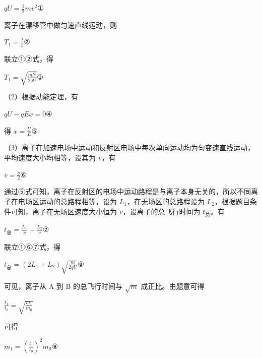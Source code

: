 \documentclass[\gkver]{gaokaozhenti}
\begin{document}
\begin{enumerate}
{$qU=\frac{1}{2}mv^{2}$①

离子在漂移管中做匀速直线运动，则

$T_{1}=\frac{l}{v}$②

联立①②式，得

$T_{1}=\sqrt{\frac{ml^{2}}{2qU}}$③

（2）根据动能定理，有

$qU-qEx=0$④

得 $x=\frac{U}{E}$⑤

（3）离子在加速电场中运动和反射区电场中每次单向运动均为匀变速直线运动，平均速度大小均相等，设其为 $\overline{v}$，有

$\overline{v}=\frac{v}{2}$⑥

通过⑤式可知，离子在反射区的电场中运动路程是与离子本身无关的，所以不同离子在电场区运动的总路程相等，设为 $L_{1}$，在无场区的总路程设为 $L_{2}$，根据题目条件可知，离子在无场区速度大小恒为 $v$，设离子的总飞行时间为 $t_{\text{总}}$。有

$t_{\text{总}}=\frac{L_{1}}{\overline{v}}+\frac{L_{2}}{v}$⑦

联立①⑥⑦式，得

$t_{\text{总}}=(2L_{1}+L_{2})\sqrt{\frac{m}{2qU}}$⑧

可见，离子从 A 到 B 的总飞行时间与 $\sqrt{m}$ 成正比。由题意可得

$\frac{t_{1}}{t_{0}}=\sqrt{\frac{m_{1}}{m_{0}}}$

可得

$m_{1}=\left(\frac{t_{1}}{t_{0}}\right)^{2}m_{0}$⑨
}

\end{enumerate}
\end{document}
